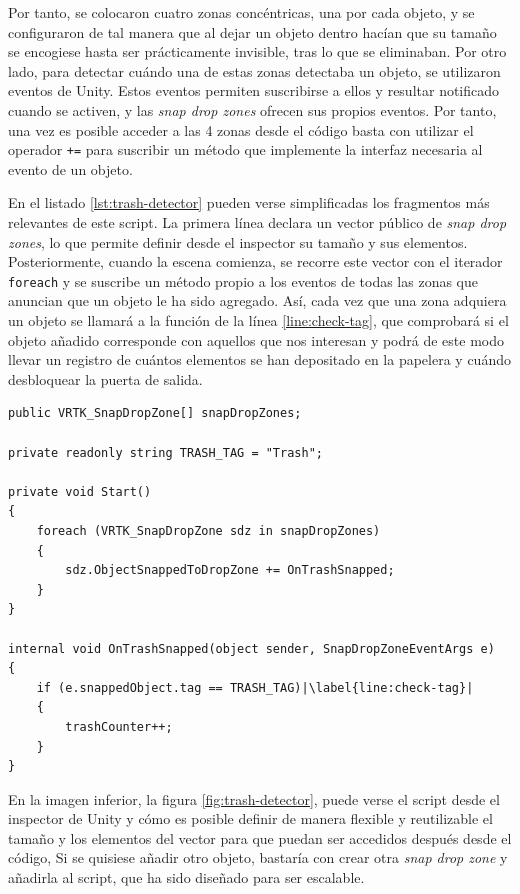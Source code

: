 Por tanto, se colocaron cuatro zonas concéntricas, una por cada objeto, y se configuraron de tal manera que al dejar un objeto dentro hacían que su tamaño se encogiese hasta ser prácticamente invisible, tras lo que se eliminaban. Por otro lado, para detectar cuándo una de estas zonas detectaba un objeto, se utilizaron eventos de Unity. Estos eventos permiten suscribirse a ellos y resultar notificado cuando se activen, y las \textit{snap drop zones} ofrecen sus propios eventos. Por tanto, una vez es posible acceder a las 4 zonas desde el código basta con utilizar el operador \texttt{+=} para suscribir un método que implemente la interfaz necesaria al evento de un objeto.

En el listado \ref{lst:trash-detector} pueden verse simplificadas los fragmentos más relevantes de este script. La primera línea declara un vector público de \textit{snap drop zones}, lo que permite definir desde el inspector su tamaño y sus elementos. Posteriormente, cuando la escena comienza, se recorre este vector con el iterador \texttt{foreach} y se suscribe un método propio a los eventos de todas las zonas que anuncian que un objeto le ha sido agregado. Así, cada vez que una zona adquiera un objeto se llamará a la función de la línea \ref{line:check-tag}, que comprobará si el objeto añadido corresponde con aquellos que nos interesan y podrá de este modo llevar un registro de cuántos elementos se han depositado en la papelera y cuándo desbloquear la puerta de salida. 

\begin{lstlisting}[caption=Fragmento del script para detectar piezas de basura, label=lst:trash-detector, escapechar=|]
public VRTK_SnapDropZone[] snapDropZones;

private readonly string TRASH_TAG = "Trash";

private void Start()
{
    foreach (VRTK_SnapDropZone sdz in snapDropZones)
    {
        sdz.ObjectSnappedToDropZone += OnTrashSnapped;
    }
}

internal void OnTrashSnapped(object sender, SnapDropZoneEventArgs e)
{
    if (e.snappedObject.tag == TRASH_TAG)|\label{line:check-tag}|
    {
        trashCounter++;
    }
}
\end{lstlisting}

En la imagen inferior, la figura \ref{fig:trash-detector}, puede verse el script desde el inspector de Unity y cómo es posible definir de manera flexible y reutilizable el tamaño y los elementos del vector para que puedan ser accedidos después desde el código, Si se quisiese añadir otro objeto, bastaría con crear otra \textit{snap drop zone} y añadirla al script, que ha sido diseñado para ser escalable.

